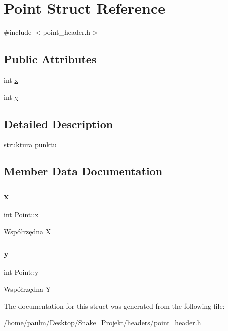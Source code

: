 \hypertarget{structPoint}{}\section{Point Struct Reference}
\label{structPoint}


{\ttfamily \#include $<$point\+\_\+header.\+h$>$}

\subsection*{Public Attributes}
\begin{DoxyCompactItemize}
\item 
int \mbox{\hyperlink{structPoint_a8c779e11e694b20e0946105a9f5de842}{x}}
\item 
int \mbox{\hyperlink{structPoint_a2e1b5fb2b2a83571f5c0bc0f66a73cf7}{y}}
\end{DoxyCompactItemize}


\subsection{Detailed Description}
struktura punktu 

\subsection{Member Data Documentation}
\mbox{\label{structPoint_a8c779e11e694b20e0946105a9f5de842}} 
\subsubsection{\texorpdfstring{x}{x}}
{\footnotesize\ttfamily int Point\+::x}

Współrzędna X \mbox{\label{structPoint_a2e1b5fb2b2a83571f5c0bc0f66a73cf7}} 
\subsubsection{\texorpdfstring{y}{y}}
{\footnotesize\ttfamily int Point\+::y}

Współrzędna Y 

The documentation for this struct was generated from the following file\+:\begin{DoxyCompactItemize}
\item 
/home/paulm/\+Desktop/\+Snake\+\_\+\+Projekt/headers/\mbox{\hyperlink{point__header_8h}{point\+\_\+header.\+h}}\end{DoxyCompactItemize}
